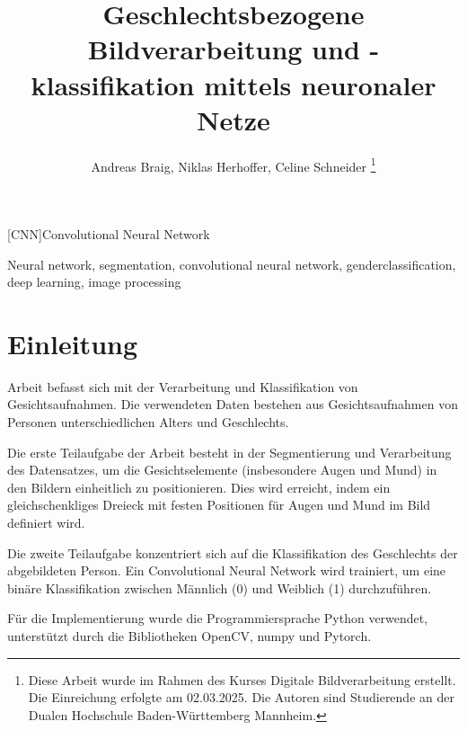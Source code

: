 \documentclass[journal,twoside,web]{ieeecolor}
\begin{document}
\begin{acronym}
    [CNN]{Convolutional Neural Network} 
\end{acronym}

\title{Geschlechtsbezogene Bildverarbeitung und -klassifikation mittels neuronaler Netze} %
\author{Andreas Braig, Niklas Herhoffer, Celine Schneider
\thanks{Diese Arbeit wurde im Rahmen des Kurses Digitale Bildverarbeitung erstellt. Die Einreichung erfolgte am 02.03.2025. Die Autoren sind Studierende an der Dualen Hochschule Baden-Württemberg Mannheim.}
}


\maketitle

    


\begin{IEEEkeywords}
    Neural network, segmentation, convolutional neural network, genderclassification, deep learning, image processing
\end{IEEEkeywords}

\section{Einleitung}
\label{sec:introduction}
 Arbeit befasst sich mit der Verarbeitung und Klassifikation von Gesichtsaufnahmen. Die verwendeten Daten bestehen aus Gesichtsaufnahmen von Personen unterschiedlichen Alters und Geschlechts. 

Die erste Teilaufgabe der Arbeit besteht in der Segmentierung und Verarbeitung des Datensatzes, um die Gesichtselemente (insbesondere Augen und Mund) in den Bildern einheitlich zu positionieren. Dies wird erreicht, indem ein gleichschenkliges Dreieck mit festen Positionen für Augen und Mund im Bild definiert wird. 

Die zweite Teilaufgabe konzentriert sich auf die Klassifikation des Geschlechts der abgebildeten Person. Ein Convolutional Neural Network wird trainiert, um eine binäre Klassifikation zwischen Männlich (0) und Weiblich (1) durchzuführen.

Für die Implementierung wurde die Programmiersprache Python verwendet, unterstützt durch die Bibliotheken OpenCV, numpy und Pytorch.
\end{document}
